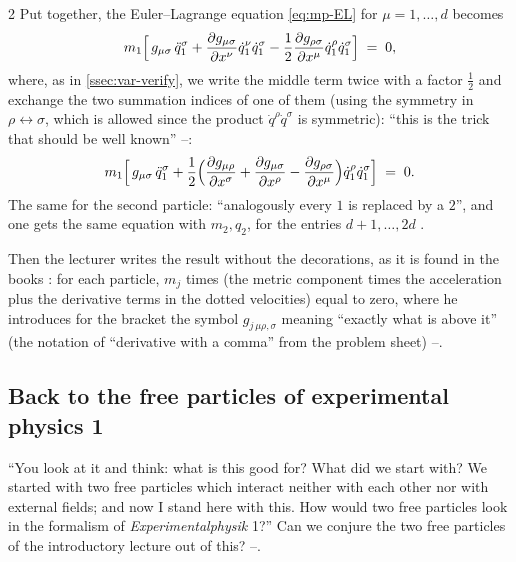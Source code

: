 \begin{paracol}{2}
Put together, the Euler--Lagrange equation \eqref{eq:mp-EL} for $\mu=1,\dots,d$ becomes
\begin{equation}\label{eq:mp-elfree1}
  m_1\Bigl[\,g_{\mu\sigma}\,\ddot q_1^\sigma+\frac{\partial g_{\mu\sigma}}{\partial x^\nu}\dot q_1^\nu\dot q_1^\sigma-\frac12\frac{\partial g_{\rho\sigma}}{\partial x^\mu}\dot q_1^\rho\dot q_1^\sigma\Bigr]\;=\;0 ,
\end{equation}
where, as in \cref{ssec:var-verify}, we write the middle term twice with a factor $\tfrac12$ and exchange the two summation indices of one of them (using the symmetry in $\rho\leftrightarrow\sigma$, which is allowed since the product $\dot q^\rho\dot q^\sigma$ is symmetric): ``this is the trick that should be well known'' --:
\begin{equation}\label{eq:mp-elfree1b}
  m_1\Bigl[\,g_{\mu\sigma}\,\ddot q_1^\sigma+\frac12\Bigl(\frac{\partial g_{\mu\rho}}{\partial x^\sigma}+\frac{\partial g_{\mu\sigma}}{\partial x^\rho}-\frac{\partial g_{\rho\sigma}}{\partial x^\mu}\Bigr)\dot q_1^\rho\dot q_1^\sigma\Bigr]\;=\;0 .
\end{equation}
The same for the second particle: ``analogously every $1$ is replaced by a $2$'', and one gets the same equation with $m_2,q_2$, for the entries $d+1,\dots,2d$ .

Then the lecturer writes the result without the decorations, as it is found in the books : for each particle, $m_j$ times (the metric component times the acceleration plus the derivative terms in the dotted velocities) equal to zero, where he introduces for the bracket the symbol $g_{j\,\mu\rho,\sigma}$ meaning ``exactly what is above it'' (the notation of ``derivative with a comma'' from the problem sheet) --.

\subsection{Back to the free particles of experimental physics 1}\label{ssec:mp-back}

``You look at it and think: what is this good for? What did we start with? We started with two free particles which interact neither with each other nor with external fields; and now I stand here with this. How would two free particles look in the formalism of \emph{Experimentalphysik} 1?'' Can we conjure the two free particles of the introductory lecture out of this? --.


\end{paracol}
